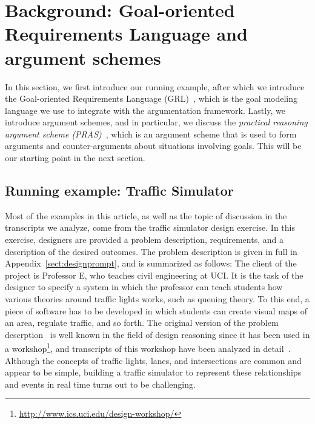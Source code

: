 \section{Background: Goal-oriented Requirements Language and argument schemes}
\label{sect:background}

In this section, we first introduce our running example, after which we introduce the Goal-oriented Requirements Language (GRL)~\cite{Amyot:2010:EGM:1841349.1841356}, which is the goal modeling language we use to integrate with the argumentation framework. Lastly, we introduce argument schemes, and in particular, we discuss the \emph{practical reasoning argument scheme (PRAS)}~\cite{atkinson2007}, which is an argument scheme that is used to form arguments and counter-arguments about situations involving goals. This will be our starting point in the next section.

\subsection{Running example: Traffic Simulator}
\label{sect:goals:runningexample}

Most of the examples in this article, as well as the topic of discussion in the transcripts we analyze, come from the traffic simulator design exercise. In this exercise, designers are provided a problem description, requirements, and a description of the desired outcomes. The problem description is given in full in Appendix~\ref{sect:designprompt}, and is summarized as follows: The client of the project is Professor E, who teaches civil engineering at UCI. It is the task of the designer to specify a system in which the professor can teach students how various theories around traffic lights works, such as queuing theory. To this end, a piece of software has to be developed in which students can create visual maps of an area, regulate traffic, and so forth. The original version of the problem descrption~\cite{UCIworkshop} is well known in the field of design reasoning since it has been used in a workshop\footnote{\url{http://www.ics.uci.edu/design-workshop/}}, and transcripts of this workshop have been analyzed in detail~\cite{Petre:2013:SDA:2535028}. Although the concepts of traffic lights, lanes, and intersections are common and appear to be simple, building a traffic simulator to represent these relationships and events in real time turns out to be challenging.


